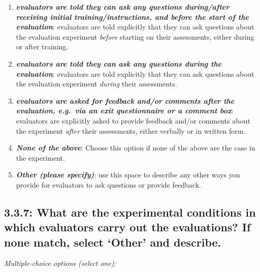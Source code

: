 \documentclass[11pt,a4paper]{article}
\newcommand{\egcvalue}[1]{\textbf{\textit{#1}}}
\begin{document}
\begin{enumerate}[itemsep=0cm,leftmargin=0.5cm,label={\small $\square$}]
    \item \egcvalue{evaluators are told they can ask any questions during/after receiving initial training/instructions, and before the start of the evaluation}: evaluators are told explicitly that they can ask  questions about the evaluation experiment \textit{before} starting on their assessments, either during or after training.
    \item \egcvalue{evaluators are told they can ask any questions during the evaluation}: evaluators are told explicitly that they can ask  questions about the evaluation experiment \textit{during} their assessments.
    \item \egcvalue{evaluators are asked for feedback and/or comments after the evaluation, e.g.\ via an exit questionnaire or a comment box}: evaluators are explicitly asked to provide feedback and/or comments about the experiment \textit{after} their assessments, either verbally or in written form.
    \item \egcvalue{None of the above}: Choose this option if none of the above are the case in the experiment.
    \item \egcvalue{Other (please specify)}: use this space to describe any other ways you provide for evaluators to ask questions or provide feedback.
\end{enumerate}

\subsection*{3.3.7: What are the experimental conditions in which evaluators carry out the evaluations? If none match, select `Other’ and describe.}

\noindent\textit{Multiple-choice options (select one)}:  
\vspace{-.1cm}
\end{document}
